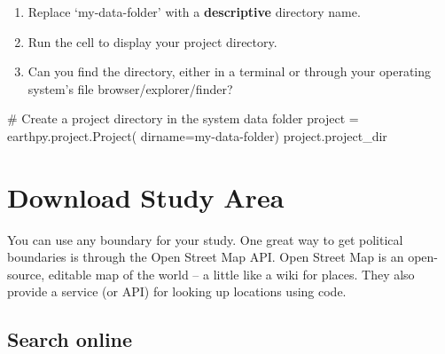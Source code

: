 \documentclass[
  letterpaper,
  DIV=11,
  numbers=noendperiod,
  oneside]{scrreprt}
\newenvironment{Shaded}{\begin{snugshade}}{\end{snugshade}}
\newcommand{\CommentTok}[1]{\textcolor[rgb]{0.37,0.37,0.37}{#1}}
\newcommand{\NormalTok}[1]{\textcolor[rgb]{0.00,0.23,0.31}{#1}}
\newcommand{\OperatorTok}[1]{\textcolor[rgb]{0.37,0.37,0.37}{#1}}
\newcommand{\StringTok}[1]{\textcolor[rgb]{0.13,0.47,0.30}{#1}}
\providecommand{\tightlist}{%
  \setlength{\itemsep}{0pt}\setlength{\parskip}{0pt}}
\begin{document}
\begin{tcolorbox}[enhanced jigsaw, colbacktitle=quarto-callout-color!10!white, opacityback=0, bottomtitle=1mm, toptitle=1mm, bottomrule=.15mm, left=2mm, colframe=quarto-callout-color-frame, leftrule=.75mm, opacitybacktitle=0.6, colback=white, rightrule=.15mm, toprule=.15mm, breakable, titlerule=0mm, title=\textcolor{quarto-callout-color}{\faInfo}\hspace{0.5em}{Try It}, coltitle=black, arc=.35mm]

\begin{enumerate}
\def\labelenumi{\arabic{enumi}.}
\tightlist
\item
  Replace `my-data-folder' with a \textbf{descriptive} directory name.
\item
  Run the cell to display your project directory.
\item
  Can you find the directory, either in a terminal or through your
  operating system's file browser/explorer/finder?
\end{enumerate}

\end{tcolorbox}

\begin{Shaded}
\begin{Highlighting}[]
\CommentTok{\# Create a project directory in the system data folder}
\NormalTok{project }\OperatorTok{=}\NormalTok{ earthpy.project.Project(}
\NormalTok{    dirname}\OperatorTok{=}\StringTok{\textquotesingle{}my{-}data{-}folder\textquotesingle{}}\NormalTok{)}
\NormalTok{project.project\_dir}
\end{Highlighting}
\end{Shaded}


\chapter{Download Study Area}\label{download-study-area}

You can use any boundary for your study. One great way to get political
boundaries is through the Open Street Map API. Open Street Map is an
open-source, editable map of the world -- a little like a wiki for
places. They also provide a service (or API) for looking up locations
using code.

\section{Search online}\label{search-online}
\end{document}
